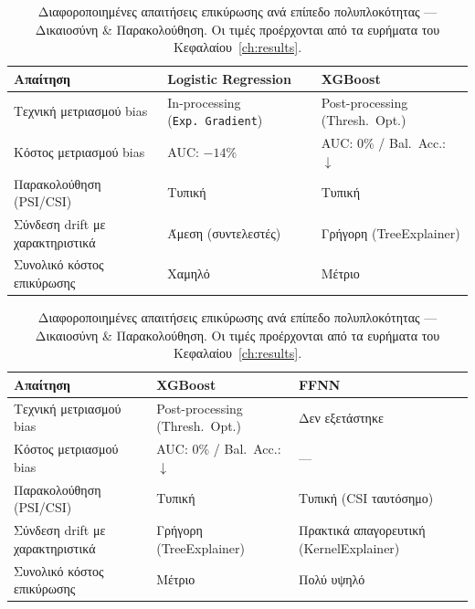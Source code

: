 \begin{table}[htbp]
    \centering
    \renewcommand{\arraystretch}{1.3}
    \caption[Απαιτήσεις επικύρωσης ανά πολυπλοκότητα — Δικαιοσύνη \& Παρακολούθηση]{Διαφοροποιημένες απαιτήσεις επικύρωσης ανά επίπεδο
             πολυπλοκότητας --- Δικαιοσύνη \& Παρακολούθηση.
             Οι τιμές προέρχονται από τα ευρήματα του
             Κεφαλαίου~\ref{ch:results}.}
    \label{tab:complexity_b}
    \small
    \begin{tabular}{p{3.8cm}p{3.8cm}p{3.8cm}}
        \toprule
        \textbf{Απαίτηση} &
        \textbf{Logistic Regression} &
        \textbf{XGBoost} \\
        \midrule
        Τεχνική μετριασμού bias &
        In-processing (\texttt{Exp.\ Gradient}) &
        Post-processing (Thresh.\ Opt.) \\
        \midrule
        Κόστος μετριασμού bias &
        AUC: $-14\%$ &
        AUC: $0\%$ / Bal.\ Acc.: $\downarrow$ \\
        \midrule
        Παρακολούθηση (PSI/CSI) &
        Τυπική &
        Τυπική \\
        \midrule
        Σύνδεση drift με χαρακτηριστικά &
        Άμεση (συντελεστές) &
        Γρήγορη (TreeExplainer) \\
        \midrule
        Συνολικό κόστος επικύρωσης &
        Χαμηλό &
        Μέτριο \\
        \bottomrule
    \end{tabular}

    \vspace{0.4cm}

    \begin{tabular}{p{3.8cm}p{3.8cm}p{3.8cm}}
        \toprule
        \textbf{Απαίτηση} &
        \textbf{XGBoost} &
        \textbf{FFNN} \\
        \midrule
        Τεχνική μετριασμού bias &
        Post-processing (Thresh.\ Opt.) &
        Δεν εξετάστηκε \\
        \midrule
        Κόστος μετριασμού bias &
        AUC: $0\%$ / Bal.\ Acc.: $\downarrow$ &
        --- \\
        \midrule
        Παρακολούθηση (PSI/CSI) &
        Τυπική &
        Τυπική (CSI ταυτόσημο) \\
        \midrule
        Σύνδεση drift με χαρακτηριστικά &
        Γρήγορη (TreeExplainer) &
        Πρακτικά απαγορευτική (KernelExplainer) \\
        \midrule
        Συνολικό κόστος επικύρωσης &
        Μέτριο &
        Πολύ υψηλό \\
        \bottomrule
    \end{tabular}
\end{table}


